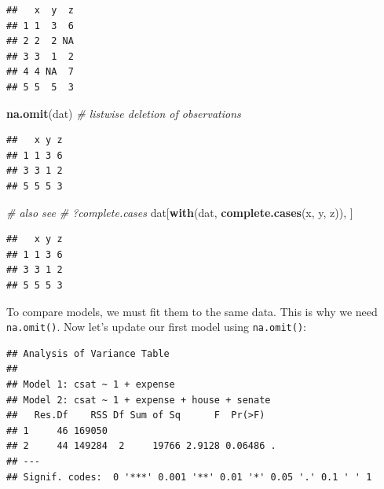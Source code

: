 \documentclass[]{book}
\newenvironment{Shaded}{\begin{snugshade}}{\end{snugshade}}
\newcommand{\CommentTok}[1]{\textcolor[rgb]{0.56,0.35,0.01}{\textit{#1}}}
\newcommand{\DataTypeTok}[1]{\textcolor[rgb]{0.13,0.29,0.53}{#1}}
\newcommand{\KeywordTok}[1]{\textcolor[rgb]{0.13,0.29,0.53}{\textbf{#1}}}
\newcommand{\NormalTok}[1]{#1}
\newcommand{\OperatorTok}[1]{\textcolor[rgb]{0.81,0.36,0.00}{\textbf{#1}}}
\newcommand{\StringTok}[1]{\textcolor[rgb]{0.31,0.60,0.02}{#1}}
\begin{document}
\begin{verbatim}
##   x  y  z
## 1 1  3  6
## 2 2  2 NA
## 3 3  1  2
## 4 4 NA  7
## 5 5  5  3
\end{verbatim}

\begin{Shaded}
\begin{Highlighting}[]
\KeywordTok{na.omit}\NormalTok{(dat) }\CommentTok{# listwise deletion of observations}
\end{Highlighting}
\end{Shaded}

\begin{verbatim}
##   x y z
## 1 1 3 6
## 3 3 1 2
## 5 5 5 3
\end{verbatim}

\begin{Shaded}
\begin{Highlighting}[]
\CommentTok{# also see}
\CommentTok{# ?complete.cases}
\NormalTok{dat[}\KeywordTok{with}\NormalTok{(dat, }\KeywordTok{complete.cases}\NormalTok{(x, y, z)), ]}
\end{Highlighting}
\end{Shaded}

\begin{verbatim}
##   x y z
## 1 1 3 6
## 3 3 1 2
## 5 5 5 3
\end{verbatim}

To compare models, we must fit them to the same data. This is why we need \texttt{na.omit()}.
Now let's update our first model using \texttt{na.omit()}:

\begin{Shaded}
\end{Shaded}

\begin{verbatim}
## Analysis of Variance Table
## 
## Model 1: csat ~ 1 + expense
## Model 2: csat ~ 1 + expense + house + senate
##   Res.Df    RSS Df Sum of Sq      F  Pr(>F)  
## 1     46 169050                              
## 2     44 149284  2     19766 2.9128 0.06486 .
## ---
## Signif. codes:  0 '***' 0.001 '**' 0.01 '*' 0.05 '.' 0.1 ' ' 1
\end{verbatim}
\end{document}
